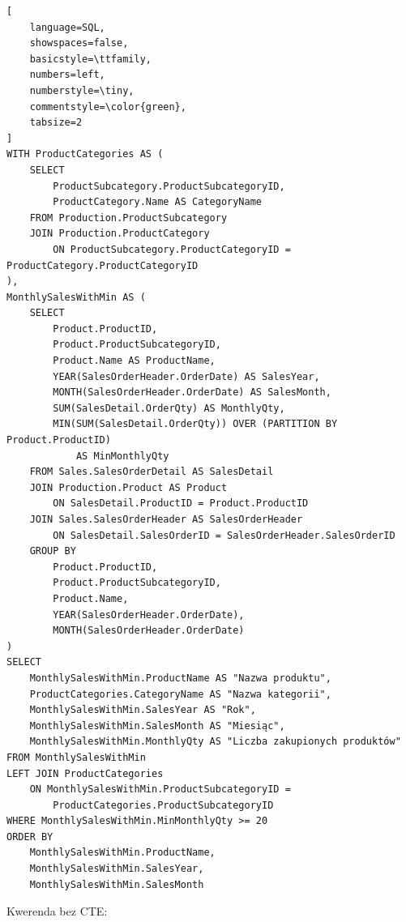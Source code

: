 \documentclass[a4paper,12pt]{article}
\begin{document}
{\small
\begin{lstlisting}[
	language=SQL,
	showspaces=false,
	basicstyle=\ttfamily,
	numbers=left,
	numberstyle=\tiny,
	commentstyle=\color{green},
	tabsize=2
]
WITH ProductCategories AS (
	SELECT 
		ProductSubcategory.ProductSubcategoryID,
		ProductCategory.Name AS CategoryName
	FROM Production.ProductSubcategory
	JOIN Production.ProductCategory 
		ON ProductSubcategory.ProductCategoryID = ProductCategory.ProductCategoryID
),
MonthlySalesWithMin AS (
	SELECT 
		Product.ProductID,
		Product.ProductSubcategoryID,
		Product.Name AS ProductName,
		YEAR(SalesOrderHeader.OrderDate) AS SalesYear,
		MONTH(SalesOrderHeader.OrderDate) AS SalesMonth,
		SUM(SalesDetail.OrderQty) AS MonthlyQty,
		MIN(SUM(SalesDetail.OrderQty)) OVER (PARTITION BY Product.ProductID) 
			AS MinMonthlyQty
	FROM Sales.SalesOrderDetail AS SalesDetail
	JOIN Production.Product AS Product 
		ON SalesDetail.ProductID = Product.ProductID
	JOIN Sales.SalesOrderHeader AS SalesOrderHeader
		ON SalesDetail.SalesOrderID = SalesOrderHeader.SalesOrderID
	GROUP BY 
		Product.ProductID, 
		Product.ProductSubcategoryID,
		Product.Name, 
		YEAR(SalesOrderHeader.OrderDate), 
		MONTH(SalesOrderHeader.OrderDate)
)
SELECT 
	MonthlySalesWithMin.ProductName AS "Nazwa produktu",
	ProductCategories.CategoryName AS "Nazwa kategorii",
	MonthlySalesWithMin.SalesYear AS "Rok",
	MonthlySalesWithMin.SalesMonth AS "Miesiąc",
	MonthlySalesWithMin.MonthlyQty AS "Liczba zakupionych produktów"
FROM MonthlySalesWithMin
LEFT JOIN ProductCategories 
	ON MonthlySalesWithMin.ProductSubcategoryID = 
		ProductCategories.ProductSubcategoryID
WHERE MonthlySalesWithMin.MinMonthlyQty >= 20
ORDER BY 
	MonthlySalesWithMin.ProductName, 
	MonthlySalesWithMin.SalesYear, 
	MonthlySalesWithMin.SalesMonth
\end{lstlisting}}

Kwerenda bez CTE:
\end{document}
